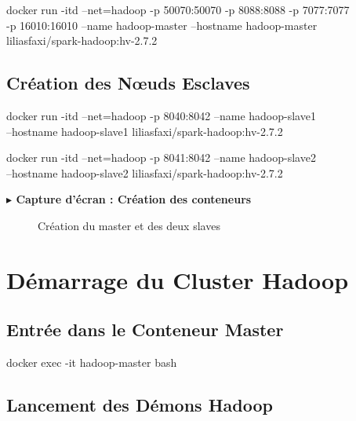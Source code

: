 \documentclass[12pt,a4paper]{report}
\newcommand{\etape}[1]{\vspace{6pt}\textbf{\color{bleuESP}$\blacktriangleright$ #1}\vspace{4pt}}
\begin{document}
\begin{cmdbox}
docker run -itd --net=hadoop -p 50070:50070 -p 8088:8088 -p 7077:7077 \\
  -p 16010:16010 --name hadoop-master --hostname hadoop-master \\
  liliasfaxi/spark-hadoop:hv-2.7.2
\end{cmdbox}

\subsection{Création des Nœuds Esclaves}

\begin{cmdbox}
docker run -itd --net=hadoop -p 8040:8042 --name hadoop-slave1 \\
  --hostname hadoop-slave1 liliasfaxi/spark-hadoop:hv-2.7.2
\end{cmdbox}

\begin{cmdbox}
docker run -itd --net=hadoop -p 8041:8042 --name hadoop-slave2 \\
  --hostname hadoop-slave2 liliasfaxi/spark-hadoop:hv-2.7.2
\end{cmdbox}

\etape{Capture d'écran : Création des conteneurs}
\begin{figure}[H]
  \centering
  \caption{Création du master et des deux slaves}
\end{figure}

\section{Démarrage du Cluster Hadoop}

\subsection{Entrée dans le Conteneur Master}

\begin{cmdbox}
docker exec -it hadoop-master bash
\end{cmdbox}

\subsection{Lancement des Démons Hadoop}
\end{document}
